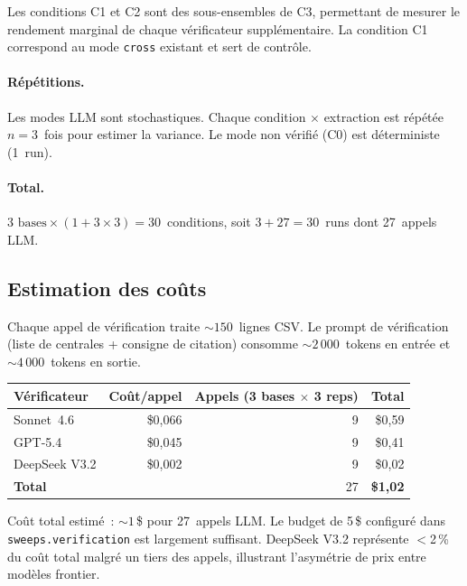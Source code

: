 \noindent Les conditions C1 et C2 sont des sous-ensembles de C3, permettant de
mesurer le rendement marginal de chaque v\'erificateur suppl\'ementaire.
La condition C1 correspond au mode \texttt{cross} existant et sert de
contr\^ole.

\paragraph{R\'ep\'etitions.} Les modes LLM sont stochastiques. Chaque condition
$\times$ extraction est r\'ep\'et\'ee $n=3$~fois pour estimer la variance.
Le mode non v\'erifi\'e (C0) est d\'eterministe (1~run).

\paragraph{Total.} $3 \text{ bases} \times (1 + 3 \times 3) = 30$~conditions,
soit $3 + 27 = 30$~runs dont 27~appels LLM.

\subsection{Estimation des co\^uts}\label{sec:multi-verif-cost}

Chaque appel de v\'erification traite ${\sim}150$~lignes CSV. Le prompt de
v\'erification (liste de centrales + consigne de citation) consomme
${\sim}2\,000$~tokens en entr\'ee et ${\sim}4\,000$~tokens en sortie.

\begin{center}
\small
\begin{tabular}{lrrr}
\toprule
\textbf{V\'erificateur} & \textbf{Co\^ut/appel} & \textbf{Appels (3 bases $\times$ 3 reps)}
  & \textbf{Total} \\
\midrule
Sonnet~4.6   & \$0,066 & 9 & \$0,59 \\
GPT-5.4      & \$0,045 & 9 & \$0,41 \\
DeepSeek V3.2 & \$0,002 & 9 & \$0,02 \\
\midrule
\textbf{Total} & & 27 & \textbf{\$1,02} \\
\bottomrule
\end{tabular}
\end{center}

\noindent Co\^ut total estim\'e~: ${\sim}1$\,\$ pour 27~appels LLM. Le budget de
5\,\$ configur\'e dans \texttt{sweeps.verification} est largement suffisant.
DeepSeek V3.2 repr\'esente $<$2\,\% du co\^ut total malgr\'e un tiers des appels,
illustrant l'asym\'etrie de prix entre mod\`eles frontier.

